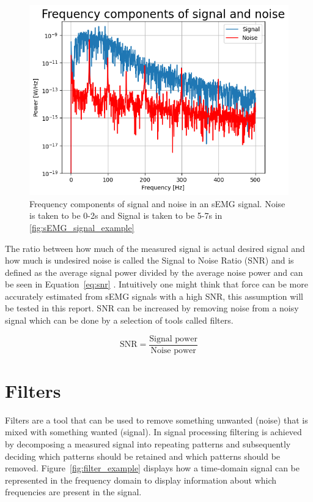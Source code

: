 \begin{figure}[h!t]
	\begin{center}
		\includegraphics[width=0.7\columnwidth]{images/sEMG_fft_signalnoise_example.png}
	\end{center}
	\caption{Frequency components of signal and noise in an sEMG signal. 
    Noise is taken to be 0-2s and Signal is taken to be 5-7s in \ref{fig:sEMG_signal_example}}
	\label{fig:sEMG_fft_signalnoise_example}
\end{figure}

The ratio between how much of the measured signal is actual desired signal and how much is undesired noise is called the Signal to Noise Ratio (SNR) and is defined as the average signal power divided by the average noise power and can be seen in Equation~\ref{eq:snr} \cite{introduction_analog_digital_communications}. Intuitively one might think that force can be more accurately estimated from sEMG signals with a high SNR, this assumption will be tested in this report. SNR can be increased by removing noise from a noisy signal which can be done by a selection of tools called filters.

\begin{equation}\label{eq:snr}
    \text{SNR} = \frac{\text{Signal power}}{\text{Noise power}}
\end{equation}

\section{Filters}
Filters are a tool that can be used to remove something unwanted (noise) that is mixed with something wanted (signal). In signal processing filtering is achieved by decomposing a measured signal into repeating patterns and subsequently deciding which patterns should be retained and which patterns should be removed. Figure~\ref{fig:filter_example} displays how a time-domain signal can be represented in the frequency domain to display information about which frequencies are present in the signal.

